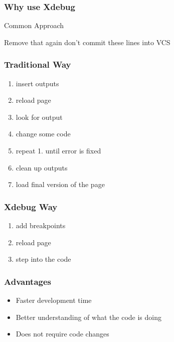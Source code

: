 \begin{frame}\frametitle{Why use Xdebug}
    \begin{exampleblock}{Common Approach}
        
    \end{exampleblock}
    \pause
    \begin{alertblock}{Remove that again}
        don't commit these lines into VCS
    \end{alertblock}
\end{frame}

\begin{frame}\frametitle{Traditional Way}
    \begin{enumerate}
        \item insert outputs 
        \item reload page
        \item look for output 
        \item change some code \pause
        \item repeat 1. until error is fixed \pause
        \item clean up outputs
        \item load final version of the page
    \end{enumerate}
\end{frame}

\begin{frame}\frametitle{Xdebug Way}
    \begin{enumerate}
        \item add breakpoints \pause
        \item reload page \pause
        \item step into the code
    \end{enumerate}
\end{frame}

\begin{frame}\frametitle{Advantages}
    \begin{itemize}
        \item Faster development time \pause
        \item Better understanding of what the code is doing \pause
        \item Does not require code changes
    \end{itemize}
\end{frame}
 

